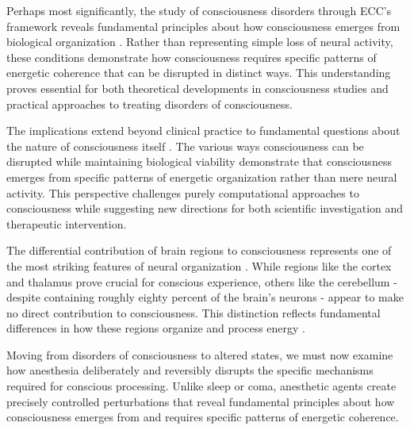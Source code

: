 Perhaps most significantly, the study of consciousness disorders through ECC's framework reveals fundamental principles about how consciousness emerges from biological organization \cite{Tononi2015}. Rather than representing simple loss of neural activity, these conditions demonstrate how consciousness requires specific patterns of energetic coherence that can be disrupted in distinct ways. This understanding proves essential for both theoretical developments in consciousness studies and practical approaches to treating disorders of consciousness.

The implications extend beyond clinical practice to fundamental questions about the nature of consciousness itself \cite{Laureys2004}. The various ways consciousness can be disrupted while maintaining biological viability demonstrate that consciousness emerges from specific patterns of energetic organization rather than mere neural activity. This perspective challenges purely computational approaches to consciousness while suggesting new directions for both scientific investigation and therapeutic intervention.

The differential contribution of brain regions to consciousness represents one of the most striking features of neural organization \cite{Baars2005}. While regions like the cortex and thalamus prove crucial for conscious experience, others like the cerebellum - despite containing roughly eighty percent of the brain's neurons - appear to make no direct contribution to consciousness. This distinction reflects fundamental differences in how these regions organize and process energy \cite{DiPerri2014}.

Moving from disorders of consciousness to altered states, we must now examine how anesthesia deliberately and reversibly disrupts the specific mechanisms required for conscious processing. Unlike sleep or coma, anesthetic agents create precisely controlled perturbations that reveal fundamental principles about how consciousness emerges from and requires specific patterns of energetic coherence.